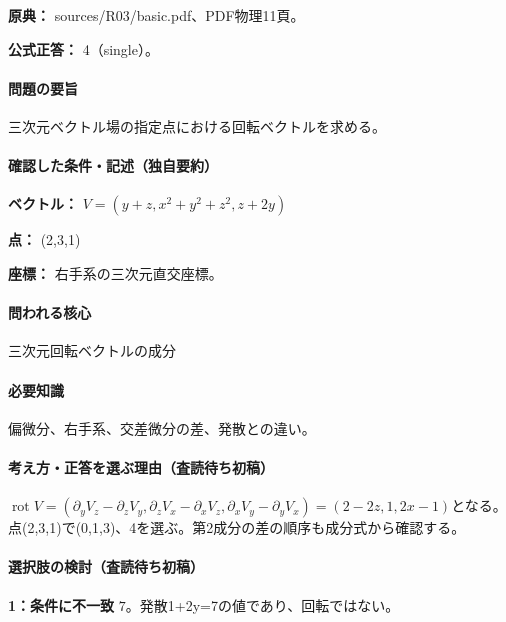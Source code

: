 \noindent\textbf{原典：} sources/R03/basic.pdf、PDF物理11頁。

\textbf{公式正答：} 4（single）。

\paragraph{問題の要旨} 三次元ベクトル場の指定点における回転ベクトルを求める。

\paragraph{確認した条件・記述（独自要約）}\mbox{}\par

\noindent\textbf{ベクトル：} \(V=(y+z,x^2+y^2+z^2,z+2y)\)\par

\noindent\textbf{点：} (2,3,1)\par

\noindent\textbf{座標：} 右手系の三次元直交座標。\par

\paragraph{問われる核心} 三次元回転ベクトルの成分

\paragraph{必要知識} 偏微分、右手系、交差微分の差、発散との違い。

\paragraph{考え方・正答を選ぶ理由（査読待ち初稿）} \(\operatorname{rot}V=(\partial_yV_z-\partial_zV_y,\partial_zV_x-\partial_xV_z,\partial_xV_y-\partial_yV_x)=(2-2z,1,2x-1)\)となる。点(2,3,1)で(0,1,3)、4を選ぶ。第2成分の差の順序も成分式から確認する。

\paragraph{選択肢の検討（査読待ち初稿）}\mbox{}\par

\noindent\textbf{1：条件に不一致} \(7\)。発散1+2y=\allowbreak{}7の値であり、回転ではない。\par

